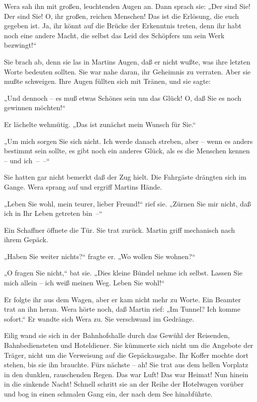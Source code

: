 Wera sah ihn mit großen, leuchtenden Augen an. Dann sprach sie:
„Der sind Sie! Der sind Sie! O, ihr großen, reichen Menschen! Das
ist die Erlösung, die euch gegeben ist. Ja, ihr könnt auf die
Brücke der Erkenntnis treten, denn ihr habt noch eine andere Macht,
die selbst das Leid des Schöpfers um sein Werk bezwingt!“

Sie brach ab, denn sie las in Martins Augen, daß er nicht wußte,
was ihre letzten Worte bedeuten sollten. Sie war nahe daran, ihr
Geheimnis zu verraten. Aber sie mußte schweigen. Ihre Augen füllten
sich mit Tränen, und sie sagte:

„Und dennoch – es muß etwas Schönes sein um das Glück! O, daß Sie
es noch gewinnen möchten!“

Er lächelte wehmütig. „Das ist zunächst mein Wunsch für Sie.“

„Um mich sorgen Sie sich nicht. Ich werde danach streben, aber –
wenn es anders bestimmt sein sollte, es gibt noch ein anderes
Glück, als es die Menschen kennen – und ich~–~–“

Sie hatten gar nicht bemerkt daß der Zug hielt. Die Fahrgäste
drängten sich im Gange. Wera sprang auf und ergriff Martins Hände.

„Leben Sie wohl, mein teurer, lieber Freund!“ rief sie. „Zürnen Sie
mir nicht, daß ich in Ihr Leben getreten bin~–“

Ein Schaffner öffnete die Tür. Sie trat zurück. Martin griff
mechanisch nach ihrem Gepäck.

„Haben Sie weiter nichts?“ fragte er. „Wo wollen Sie wohnen?“

„O fragen Sie nicht,“ bat sie. „Dies kleine Bündel nehme ich
selbst. Lassen Sie mich allein – ich weiß meinen Weg. Leben Sie
wohl!“

Er folgte ihr aus dem Wagen, aber er kam nicht mehr zu Worte. Ein
Beamter trat an ihn heran. Wera hörte noch, daß Martin rief: „Im
Tunnel? Ich komme sofort.“ Er wandte sich Wera zu. Sie verschwand
im Gedränge.

Eilig wand sie sich in der Bahnhofshalle durch das Gewühl der
Reisenden, Bahnbediensteten und Hoteldiener. Sie kümmerte sich
nicht um die Angebote der Träger, nicht um die Verweisung auf die
Gepäckausgabe. Ihr Koffer mochte dort stehen, bis sie ihn brauchte.
Fürs nächste – ah! Sie trat aus dem hellen Vorplatz in den dunklen,
rauschenden Regen. Das war Luft! Das war Heimat! Nun hinein in die
sinkende Nacht! Schnell schritt sie an der Reihe der Hotelwagen
vorüber und bog in einen schmalen Gang ein, der nach dem See
hinabführte.

